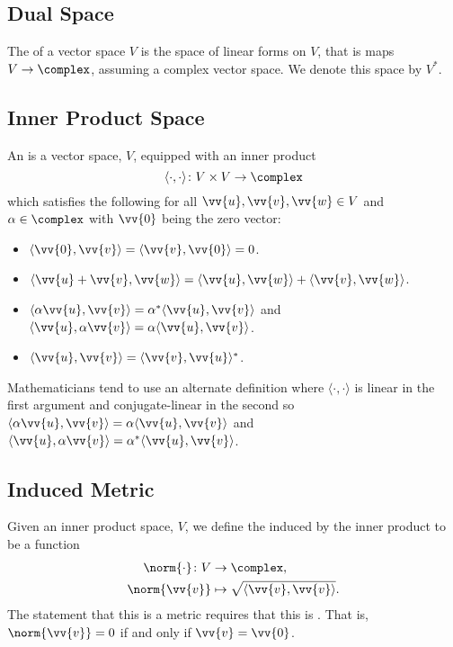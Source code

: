     \subsection{Dual Space}
    The  of a vector space \(V\) is the space of linear forms on \(V\), that is maps \(V \to \complex\), assuming a complex vector space.
    We denote this space by \(V^*\).
    
    \subsection{Inner Product Space}
    An  is a vector space, \(V\), equipped with an inner product
    \begin{equation}
        \langle \cdot, \cdot \rangle \colon V \times V \to \complex
    \end{equation}
    which satisfies the following for all \(\vv{u}, \vv{v}, \vv{w} \in V\) and \(\alpha \in \complex\) with \(\vv{0}\) being the zero vector:
    \begin{itemize}
        \item \(\langle \vv{0}, \vv{v} \rangle = \langle \vv{v}, \vv{0} \rangle = 0\).
        \item \(\langle \vv{u} + \vv{v}, \vv{w} \rangle = \langle \vv{u}, \vv{w} \rangle + \langle \vv{v}, \vv{w} \rangle\).
        \item \(\langle \alpha\vv{u}, \vv{v} \rangle = \alpha^*\langle \vv{u}, \vv{v} \rangle\) and \(\langle \vv{u}, \alpha\vv{v} \rangle = \alpha\langle \vv{u}, \vv{v} \rangle\).
        \item \(\langle \vv{u}, \vv{v} \rangle = \langle \vv{v}, \vv{u} \rangle^*\).
    \end{itemize}
    
    \begin{wrn}
        Mathematicians tend to use an alternate definition where \(\langle \cdot, \cdot \rangle\) is linear in the first argument and conjugate-linear in the second so \(\langle \alpha\vv{u}, \vv{v} \rangle = \alpha\langle\vv{u},\vv{v}\rangle\) and \(\langle \vv{u}, \alpha\vv{v}\rangle = \alpha^*\langle\vv{u},\vv{v}\rangle\).
    \end{wrn}
    
    \subsection{Induced Metric}
    Given an inner product space, \(V\), we define the  induced by the inner product to be a function
    \begin{align}
        \norm{\cdot} \colon V &\to \complex,\\
        \norm{\vv{v}} &\mapsto \sqrt{\langle \vv{v}, \vv{v}\rangle}.
    \end{align}
    The statement that this is a metric requires that this is .
    That is, \(\norm{\vv{v}} = 0\) if and only if \(\vv{v} = \vv{0}\).
    
